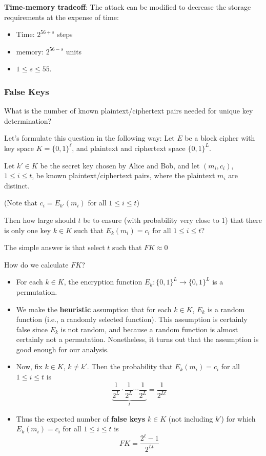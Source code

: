 \documentclass[12pt,titlepage]{article}
\begin{document}
\textbf{Time-memory tradeoff}: The attack can be modified to decrease the storage requirements at the expense of time:\begin{itemize}
\item Time: $2^{56+s}$ steps
\item memory: $2^{56-s}$ units
\item $1 \leq s \leq 55$.
\end{itemize}

\subsubsection{False Keys}
What is the number of known plaintext/ciphertext pairs needed for unique key determination? 

Let's formulate this question in the following way: 
Let $E$ be a block cipher with key space $K = \{0, 1\}^\ell $, and plaintext and ciphertext space $\{0, 1\}^L$.

Let $k' \in K$ be the secret key chosen by Alice and Bob, and let $(m_i , c_i)$, $1 \leq i \leq t$, be known plaintext/ciphertext pairs, where the plaintext $m_i$ are distinct.

(Note that $c_i = E_{k'}(m_i)$ for all $1 \leq i \leq t$)

Then how large should $t$ be to ensure (with probability very close to 1) that there is only one key $k \in K$ such that $E_k (m_i) = c_i$ for all $1 \leq i \leq t$?

The simple answer is that select $t$ such that $FK \approx 0$

How do we calculate $FK$? \begin{itemize}
\item For each $k \in K$, the encryption function $E_k : \{0, 1\}^L \rightarrow \{0, 1\}^L$ is a permutation.
\item We make the \textbf{heuristic} assumption that for each $k \in K$, $E_k$ is a random function (i.e., a randomly selected function). This assumption is certainly false since $E_k$ is not random, and because a random function is almost certainly not a permutation. Nonetheless, it turns out that the assumption is good enough for our analysis.
\item Now, fix $k \in K$, $k \neq k'$. Then the probability that $E_k(m_i) = c_i$ for all $1 \leq i \leq t$ is $$\underbrace{\frac{1}{2^L}\cdot\frac{1}{2^L}\cdots \frac{1}{2^L}}_{t} = \frac{1}{2^{Lt}}$$
\item Thus the expected number of \textbf{false keys} $k \in K$ (not including $k'$) for which $E_k(m_i) = c_i$ for all $1 \leq i \leq t$ is $$FK = \frac{2^\ell -1}{2^{Lt}}$$
\end{itemize}
\end{document}
